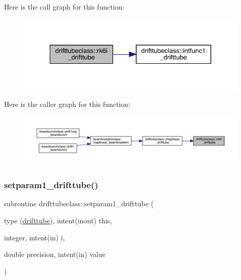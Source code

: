 Here is the call graph for this function\+:\nopagebreak
\begin{figure}[H]
\begin{center}
\leavevmode
\includegraphics[width=328pt]{namespacedrifttubeclass_a186a18efb61fce23e16a18534af446fb_cgraph}
\end{center}
\end{figure}
Here is the caller graph for this function\+:\nopagebreak
\begin{figure}[H]
\begin{center}
\leavevmode
\includegraphics[width=350pt]{namespacedrifttubeclass_a186a18efb61fce23e16a18534af446fb_icgraph}
\end{center}
\end{figure}
\mbox{\label{namespacedrifttubeclass_ae2e1974821a810c5d65afd4546b1a690}} 
\subsubsection{\texorpdfstring{setparam1\_drifttube()}{setparam1\_drifttube()}}
{\footnotesize\ttfamily subroutine drifttubeclass\+::setparam1\+\_\+drifttube (\begin{DoxyParamCaption}\item[{type (\mbox{\hyperlink{namespacedrifttubeclass_structdrifttubeclass_1_1drifttube}{drifttube}}), intent(inout)}]{this,  }\item[{integer, intent(in)}]{i,  }\item[{double precision, intent(in)}]{value }\end{DoxyParamCaption})}

